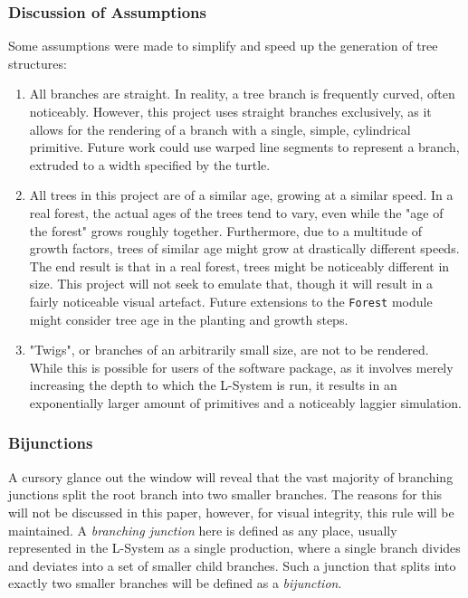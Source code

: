 \documentclass{article}
\newcommand{\tab}{\hspace*{2em}}
\begin{document}
            \subsubsection{Discussion of Assumptions}
    \tab Some assumptions were made to simplify and speed up the generation of tree structures:
\begin{enumerate}
    \item All branches are straight. In reality, a tree branch is frequently curved, often
noticeably. However, this project uses straight branches exclusively, as it allows for the
rendering of a branch with a single, simple, cylindrical primitive. Future work could use warped
line segments to represent a branch, extruded to a width specified by the turtle.

    \item All trees in this project are of a similar age, growing at a similar speed. In a real
forest, the actual ages of the trees tend to vary, even while the "age of the forest" grows
roughly together. Furthermore, due to a multitude of growth factors, trees of similar age might
grow at drastically different speeds. The end result is that in a real forest, trees might be
noticeably different in size. This project will not seek to emulate that, though it will result in
a fairly noticeable visual artefact. Future extensions to the \verb|Forest| module might consider
tree age in the planting and growth steps.

    \item "Twigs", or branches of an arbitrarily small size, are not to be rendered. While this is
possible for users of the software package, as it involves merely increasing the depth to which the
L-System is run, it results in an exponentially larger amount of primitives and a noticeably
laggier simulation.

\end{enumerate}

            \subsubsection{Bijunctions}
    \tab A cursory glance out the window will reveal that the vast majority of branching junctions
split the root branch into two smaller branches. The reasons for this will not be discussed in this
paper, however, for visual integrity, this rule will be maintained. A \emph{branching junction}
here is defined as any place, usually represented in the L-System as a single production, where a
single branch divides and deviates into a set of smaller child branches. Such a junction that
splits into exactly two smaller branches will be defined as a \emph{bijunction}.
\end{document}
